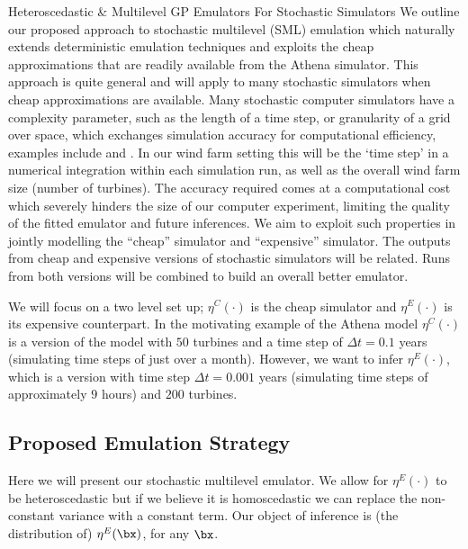 \begin{chapter}{Heteroscedastic \& Multilevel GP Emulators For Stochastic Simulators\label{Ch:Hetsml}}
We outline our proposed approach to stochastic multilevel (SML) emulation which naturally extends deterministic emulation techniques and exploits the cheap approximations that are readily available from the Athena simulator. This approach is quite general and will apply to many stochastic simulators when cheap approximations are available. Many stochastic computer simulators have a complexity parameter, such as the length of a time step, or granularity of a grid over space, which exchanges simulation accuracy for computational efficiency, examples include \cite{Kennedy2000} and \citet{Le2014}. In our wind farm setting this will be the `time step' in a numerical integration within each simulation run, as well as the overall wind farm size (number of turbines). The accuracy required comes at a computational cost which severely hinders the size of our computer experiment, limiting the quality of the fitted emulator and future inferences. We aim to exploit such properties in jointly modelling the ``cheap'' simulator and ``expensive'' simulator. The outputs from cheap and expensive versions of stochastic simulators will be related. Runs from both versions will be combined to build an overall better emulator.

We will focus on a two level set up;  $\eta^C(\cdot)$ is the cheap simulator and $\eta^E(\cdot)$ is its expensive counterpart. In the motivating example of the Athena model $\eta^C(\cdot)$ is a version of the model with $50$ turbines and a time step of $\Delta t = 0.1$ years (simulating time steps of just over a month). However, we want to infer $\eta^E (\cdot)$, which is a version with time step $\Delta t = 0.001$ years (simulating time steps of approximately $9$ hours) and $200$ turbines.

\subsection{Proposed Emulation Strategy}
Here we will present our stochastic multilevel emulator. We allow for $\eta^E(\cdot)$ to be heteroscedastic but if we believe it is homoscedastic we can replace the non-constant variance with a constant term. Our object of inference is (the distribution of) $\eta^E(\bx)$, for any $\bx$.


\end{chapter}

